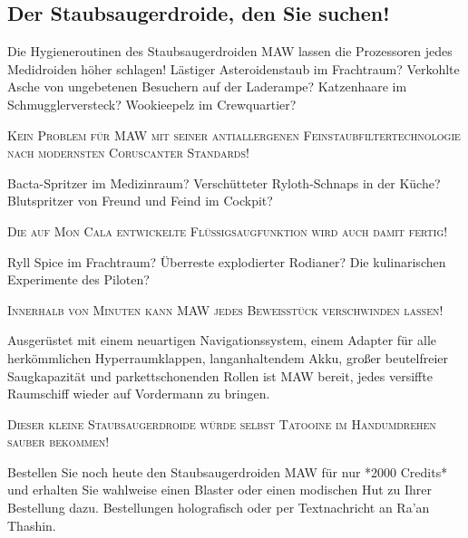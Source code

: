 \documentclass[final]{multiversum}
\begin{document}
\subsection{Der Staubsaugerdroide, den Sie suchen!}

Die Hygieneroutinen des Staubsaugerdroiden MAW lassen die Prozessoren jedes Medidroiden höher schlagen!
Lästiger Asteroidenstaub im Frachtraum?
Verkohlte Asche von ungebetenen Besuchern auf der Laderampe?
Katzenhaare im Schmugglerversteck? Wookieepelz im Crewquartier?\\
\begin{center}\textsc{Kein Problem für MAW mit seiner antiallergenen Feinstaubfiltertechnologie nach modernsten Coruscanter Standards!}\\\end{center}
Bacta-Spritzer im Medizinraum?
Verschütteter Ryloth-Schnaps in der Küche?
Blutspritzer von Freund und Feind im Cockpit?\\
\begin{center}\textsc{Die auf Mon Cala entwickelte Flüssigsaugfunktion wird auch damit fertig!}\\\end{center}
Ryll Spice im Frachtraum?
Überreste explodierter Rodianer?
Die kulinarischen Experimente des Piloten?
\begin{center}\textsc{Innerhalb von Minuten kann MAW jedes Beweisstück verschwinden lassen!}\\\end{center}
Ausgerüstet mit einem neuartigen Navigationssystem, einem Adapter für alle herkömmlichen Hyperraumklappen, langanhaltendem Akku, großer beutelfreier Saugkapazität und parkettschonenden Rollen ist MAW bereit, jedes versiffte Raumschiff wieder auf Vordermann zu bringen.
\begin{center}\textsc{Dieser kleine Staubsaugerdroide würde selbst Tatooine im Handumdrehen sauber bekommen!}\\\end{center}
Bestellen Sie noch heute den Staubsaugerdroiden MAW für nur *2000 Credits* und erhalten Sie wahlweise einen Blaster oder einen modischen Hut zu Ihrer Bestellung dazu. 
Bestellungen holografisch oder per Textnachricht an Ra'an Thashin.\\
\end{document}
